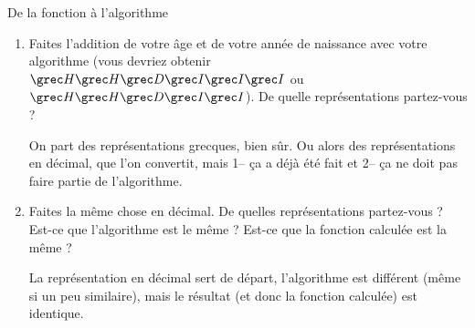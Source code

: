 \begin{exercice}
\begin{exercicelet}{De la fonction à l'algorithme}
\begin{enumerate}
\begin{xcorrection}
        C'est un exemple, il y en a plusieurs possibles.\end{xcorrection}
    \item Faites l'addition de votre âge et de votre année de naissance
      avec votre algorithme (vous devriez obtenir
      $\Eta\Eta\Delta\Iota\Iota\Iota$ ou $\Eta\Eta\Delta\Iota\Iota$). De
      quelle représentations partez-vous ?
      \begin{correction}On part des représentations grecques, bien
        sûr. Ou alors des représentations en décimal, que l'on
        convertit, mais 1-- ça a déjà été fait et 2-- ça ne doit pas
        faire partie de l'algorithme.\end{correction}
    \item Faites la même chose en décimal. De quelles représentations
      partez-vous ? Est-ce que l'algorithme est le même ? Est-ce que
      la fonction calculée est la même ?
      \begin{xcorrection} La représentation en décimal sert de départ,
        l'algorithme est différent (même si un peu similaire), mais le résultat
        (et donc la fonction calculée) est identique.
      \end{xcorrection}
    \end{enumerate}
  \end{exercicelet}
\end{exercice}
